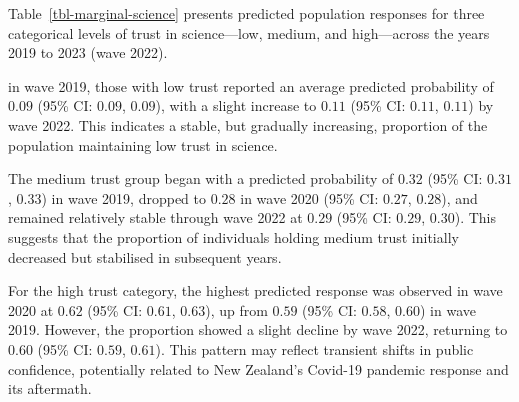 \documentclass[
  single column]{article}
\begin{document}
Table~\ref{tbl-marginal-science} presents predicted population responses
for three categorical levels of trust in science---low, medium, and
high---across the years 2019 to 2023 (wave 2022).

in wave 2019, those with low trust reported an average predicted
probability of \(0.09\) (95\% CI: \(0.09\), \(0.09\)), with a slight
increase to \(0.11\) (95\% CI: \(0.11\), \(0.11\)) by wave 2022. This
indicates a stable, but gradually increasing, proportion of the
population maintaining low trust in science.

The medium trust group began with a predicted probability of \(0.32\)
(95\% CI: \(0.31\), \(0.33\)) in wave 2019, dropped to \(0.28\) in wave
2020 (95\% CI: \(0.27\), \(0.28\)), and remained relatively stable
through wave 2022 at \(0.29\) (95\% CI: \(0.29\), \(0.30\)). This
suggests that the proportion of individuals holding medium trust
initially decreased but stabilised in subsequent years.

For the high trust category, the highest predicted response was observed
in wave 2020 at \(0.62\) (95\% CI: \(0.61\), \(0.63\)), up from \(0.59\)
(95\% CI: \(0.58\), \(0.60\)) in wave 2019. However, the proportion
showed a slight decline by wave 2022, returning to \(0.60\) (95\% CI:
\(0.59\), \(0.61\)). This pattern may reflect transient shifts in public
confidence, potentially related to New Zealand's Covid-19 pandemic
response and its aftermath.
\end{document}
